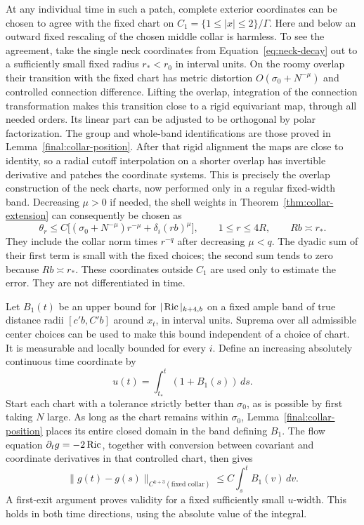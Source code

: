 At any individual time in such a patch, complete exterior coordinates
can be chosen to agree with the fixed chart on $C_1=\{1\le|x|\le2\}/\Gamma$.
Here and below an outward fixed rescaling of the chosen middle collar
is harmless.  To see the agreement, take the single neck coordinates
from Equation~\eqref{eq:neck-decay} out to a sufficiently small fixed
radius $r_*<r_0$ in interval units.  On the roomy overlap their
transition with the fixed chart has metric distortion
$O(\sigma_0+N^{-\mu})$ and controlled connection difference.  Lifting
the overlap, integration of the connection transformation makes
this transition close to a rigid equivariant map, through all needed
orders.  Its linear part can be adjusted to be orthogonal by polar
factorization.  The group and whole-band identifications are those
proved in Lemma~\ref{final:collar-position}.  After that rigid
alignment the maps are close to identity, so a radial cutoff
interpolation on a shorter overlap has invertible derivative and
patches the coordinate systems.  This is precisely the overlap
construction of the neck charts, now performed only in a regular
fixed-width band.  Decreasing $\mu>0$ if needed, the shell weights in
Theorem~\ref{thm:collar-extension} can consequently be chosen as
\begin{equation}\label{final:collar-weights}
 \theta_r\le C\bigl[(\sigma_0+N^{-\mu})r^{-\mu}
                    +\delta_i(rb)^\mu\bigr],
 \qquad 1\le r\le4R,\qquad Rb\asymp r_*.
\end{equation}
They include the collar norm times $r^{-q}$ after decreasing $\mu<q$.
The dyadic sum of their first term is small with the fixed choices;
the second sum tends to zero because $Rb\asymp r_*$.
These coordinates outside $C_1$ are used only to estimate the error.
They are not differentiated in time.

Let $B_1(t)$ be an upper bound for $|\operatorname{Ric}|_{k+4,b}$ on a fixed ample
band of true distance radii $[c'b,C'b]$ around $x_t$, in interval
units.  Suprema over all admissible center choices can be used to
make this bound independent of a choice of chart.  It is measurable
and locally bounded for every $i$.  Define an increasing absolutely
continuous time coordinate by
\begin{equation}\label{final:time-coordinate}
 u(t)=\int_{t_*}^{t}(1+B_1(s))\,ds .
\end{equation}
Start each chart with a tolerance strictly better than $\sigma_0$,
as is possible by first taking $N$ large.  As long as the chart
remains within $\sigma_0$, Lemma~\ref{final:collar-position} places
its entire closed domain in the band defining $B_1$.  The flow equation
$\partial_tg=-2\operatorname{Ric}$, together with conversion between covariant and
coordinate derivatives in that controlled chart, then gives
\[
 \|g(t)-g(s)\|_{C^{k+3}(\text{fixed collar})}
       \le C\int_s^t B_1(v)\,dv .
\]
A first-exit argument proves validity for a fixed sufficiently small
$u$-width.  This holds in both time directions, using the absolute
value of the integral.

